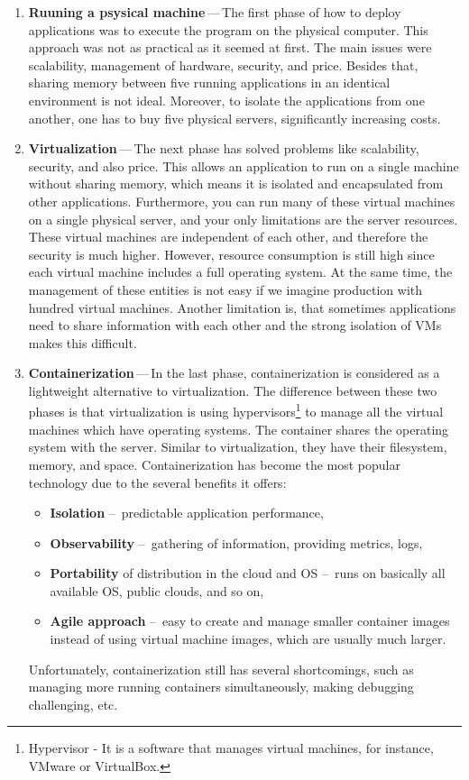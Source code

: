 \begin{enumerate}
    \item \textbf{Ruuning a psysical machine}\,---\,The first phase of how to deploy applications was to execute the program on the physical computer.
    This approach was not as practical as it seemed at first.
    The main issues were scalability, management of hardware, security, and price.
    Besides that, sharing memory between five running applications in an identical environment is not ideal.
    Moreover, to isolate the applications from one another, one has to buy five physical servers, significantly increasing costs.

    \item \textbf{Virtualization}\,---\,The next phase has solved problems like scalability, security, and also price.
    This allows an application to run on a single machine without sharing memory, which means it is isolated and encapsulated from other applications.
    Furthermore, you can run many of these virtual machines on a single physical server, and your only limitations are the server resources.
    These virtual machines are independent of each other, and therefore the security is much higher.
    However, resource consumption is still high since each virtual machine includes a full operating system.
    At the same time, the management of these entities is not easy if we imagine production with hundred virtual machines.
    Another limitation is, that sometimes applications need to share information with each other and the strong isolation of VMs makes this difficult.

    \item \textbf{Containerization}\,---\,In the last phase, containerization is considered as a lightweight alternative to virtualization.
    The difference between these two phases is that virtualization is using hypervisors\footnote{Hypervisor - It is a software that manages virtual machines, for instance, VMware or VirtualBox.} to manage all the virtual machines which have operating systems. The container shares the operating system with the server. Similar to virtualization, they have their filesystem, memory, and space. Containerization has become the most popular technology due to the several benefits it offers:
    \begin{itemize}[itemsep=1mm, parsep=0pt]
        \item \textbf{Isolation} \---\ predictable application performance,
        \item \textbf{Observability} \---\ gathering of information, providing metrics, logs,
        \item \textbf{Portability} of distribution in the cloud and OS \---\ runs on basically all available OS, public clouds, and so on,
        \item \textbf{Agile approach} \---\ easy to create and manage smaller container images instead of using virtual machine images, which are usually much larger.
    \end{itemize}
    Unfortunately, containerization still has several shortcomings, such as managing more running containers simultaneously, making debugging challenging, etc.


\end{enumerate}
